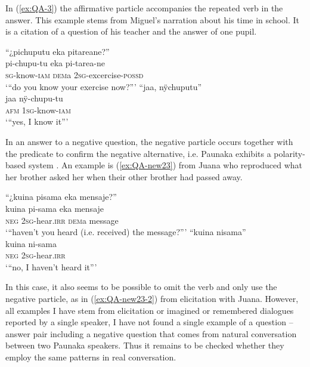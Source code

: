 In (\ref{ex:QA-3}) the affirmative particle accompanies the repeated verb in the answer. This example stems from Miguel’s narration about his time in school. It is a citation of a question of his teacher and the answer of one pupil.

\ea\label{ex:QA-3}
  \ea
\begingl
\glpreamble “¿pichuputu eka pitareane?”\\
\gla pi-chupu-tu eka pi-tarea-ne\\
\textsc{sg}-know-\textsc{iam} \textsc{dem}a 2\textsc{sg}-excercise-\textsc{possd}\\
\glft ‘“do you know your exercise now?”'
\endgl
  \ex
\begingl
\glpreamble “jaa, nÿchuputu”\\
\gla jaa nÿ-chupu-tu\\
\glb \textsc{afm} 1\textsc{sg}-know-\textsc{iam}\\
\glft ‘“yes, I know it”’
\endgl
\trailingcitation{[mxx-p181027l-1.047]}
\z
\xe

In an answer to a negative question, the negative particle occurs together with the predicate to confirm the negative alternative, i.e. Paunaka exhibits a polarity-based system \citep[cf.][140]{Holmberg2016}. An example is (\ref{ex:QA-new23}) from Juana who reproduced what her brother asked her when their other brother had passed away.

\ea\label{ex:QA-new23}
  \ea
\begingl
\glpreamble “¿kuina pisama eka mensaje?”\\
\gla kuina pi-sama eka mensaje\\
\glb \textsc{neg} 2\textsc{sg}-hear.\textsc{irr} \textsc{dem}a message\\
\glft ‘“haven’t you heard (i.e. received) the message?”'
\endgl
  \ex
\begingl
\glpreamble “kuina nisama”\\
\gla kuina ni-sama\\
\glb \textsc{neg} 2\textsc{sg}-hear.\textsc{irr}\\
\glft ‘“no, I haven’t heard it”’
\endgl
\trailingcitation{[jxx-p120430l-2.266-267]}
\z
\xe

In this case, it also seems to be possible to omit the verb and only use the negative particle, as in (\ref{ex:QA-new23-2}) from elicitation with Juana. However, all examples I have stem from elicitation or imagined or remembered dialogues reported by a single speaker, I have not found a single example of a question – answer pair including a negative question that comes from natural conversation between two Paunaka speakers. Thus it remains to be checked whether they employ the same patterns in real conversation.

